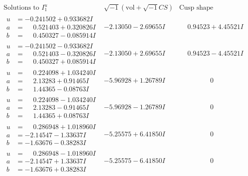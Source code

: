 \documentclass[1p]{elsarticle_modified}
\theoremstyle{definition}
\newcommand{\I}{\sqrt{-1}}
\begin{document}
$$\begin{array}{c|c|c}  
\text{Solutions to }I^u_{1}& \I (\text{vol} + \sqrt{-1}CS) & \text{Cusp shape}\\
 \hline 
\begin{aligned}
u &= -0.241502 + 0.933682 I \\
a &= \phantom{-}0.521403 + 0.320826 I \\
b &= \phantom{-}0.450327 - 0.085914 I\end{aligned}
 & -2.13050 - 2.69655 I & \phantom{-}0.94523 + 4.45521 I \\ \hline\begin{aligned}
u &= -0.241502 - 0.933682 I \\
a &= \phantom{-}0.521403 - 0.320826 I \\
b &= \phantom{-}0.450327 + 0.085914 I\end{aligned}
 & -2.13050 + 2.69655 I & \phantom{-}0.94523 - 4.45521 I \\ \hline\begin{aligned}
u &= \phantom{-}0.224098 + 1.034240 I \\
a &= \phantom{-}2.13283 + 0.91465 I \\
b &= \phantom{-}1.44365 - 0.08763 I\end{aligned}
 & -5.96928 + 1.26789 I & \phantom{-0.000000 } 0 \\ \hline\begin{aligned}
u &= \phantom{-}0.224098 - 1.034240 I \\
a &= \phantom{-}2.13283 - 0.91465 I \\
b &= \phantom{-}1.44365 + 0.08763 I\end{aligned}
 & -5.96928 - 1.26789 I & \phantom{-0.000000 } 0 \\ \hline\begin{aligned}
u &= \phantom{-}0.286948 + 1.018960 I \\
a &= -2.14547 - 1.33637 I \\
b &= -1.63676 - 0.38283 I\end{aligned}
 & -5.25575 + 6.41850 I & \phantom{-0.000000 } 0 \\ \hline\begin{aligned}
u &= \phantom{-}0.286948 - 1.018960 I \\
a &= -2.14547 + 1.33637 I \\
b &= -1.63676 + 0.38283 I\end{aligned}
 & -5.25575 - 6.41850 I & \phantom{-0.000000 } 0 \\ \hline\begin{aligned}

\end{aligned}
\end{array}$$
\end{document}
